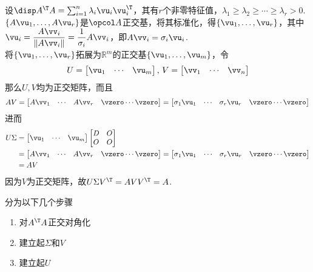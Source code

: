 \begin{analysis}
设$\disp A^\T A=\sum_{i=1}^n\lambda_i\vu_i\vu_i^\T $，其有$r$个非零特征值，$\lambda_1\geq\lambda_2\geq\cdots\geq\lambda_r>0$.\\
$\{A\vu_1,\dots,A\vu_r\}$是$\opcol A$正交基，将其标准化，得$\{\vu_1,\dots,\vu_r\}$，其中$\vu_i=\dfrac{A\vv_i}{\|A\vv_i\|}=\dfrac{1}{\sigma_i}A\vv_i$，即$A\vv_i=\sigma_i\vu_i$.\\
将$\{\vu_1,\dots,\vu_r\}$拓展为$\mathbb{R}^m$的正交基$\{\vu_1,\dots,\vu_m\}$，令
\[U=\begin{bmatrix}\vu_1&\cdots&\vu_m\end{bmatrix},\,V=\begin{bmatrix}\vv_1&\cdots&\vv_n\end{bmatrix}\]
那么$U,V$均为正交矩阵，而且
\[AV=\begin{bmatrix}A\vv_1&\cdots&A\vv_r&\vzero\cdots\vzero\end{bmatrix}=\begin{bmatrix}\sigma_1\vu_1&\cdots&\sigma_r\vu_r&\vzero\cdots\vzero\end{bmatrix}\]
进而
\[\begin{aligned}U\Sigma&=\begin{bmatrix}\vu_1&\cdots&\vu_m\end{bmatrix}\begin{bmatrix}D&O\\O&O\end{bmatrix}\\
&=\begin{bmatrix}A\vv_1&\cdots&A\vv_r&\vzero\cdots\vzero\end{bmatrix}=\begin{bmatrix}\sigma_1\vu_1&\cdots&\sigma_r\vu_r&\vzero\cdots\vzero\end{bmatrix}\\
&=AV\end{aligned}\]
因为$V$为正交矩阵，故$U\Sigma V^\T =AVV^\T =A$.
\end{analysis}
\begin{myalgorithm}[奇异值分解]
分为以下几个步骤
\begin{enumerate}
	\itemsep -3pt
	\item 对$A^\T A$正交对角化
	\item 建立起$\Sigma$和$V$
	\item 建立起$U$
\end{enumerate}
\end{myalgorithm}


